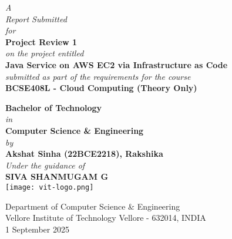 \documentclass[12pt]{article}
\begin{document}
\begin{titlepage}
\thispagestyle{empty}

\begin{minipage}[c][\textheight][s]{\textwidth}
\centering

{\itshape A}\\[6pt]
{\itshape Report Submitted}\\[6pt]
{\itshape for}\\[10pt]
{\Large\bfseries Project Review 1}\\[8pt]
{\itshape on the project entitled}\\[10pt]
{\LARGE\bfseries Java Service on AWS EC2 via Infrastructure as Code}\\[10pt]

{\itshape submitted as part of the requirements for the course}\\[6pt]
{\Large\bfseries BCSE408L - Cloud Computing (Theory Only)}\\[6pt]


{\Large\bfseries Bachelor of Technology}\\[6pt]
{\itshape in}\\[4pt]
{\Large\bfseries Computer Science \& Engineering}\\[10pt]

{\itshape by}\\[6pt]
{\large\bfseries Akshat Sinha (22BCE2218), Rakshika}\\[10pt]

{\itshape Under the guidance of}\\[6pt]
{\large\bfseries SIVA SHANMUGAM G}\\[12pt]

\texttt{[image: vit-logo.png]}


{\large Department of Computer Science \& Engineering}\\
{\large Vellore Institute of Technology Vellore - 632014, INDIA}\\[8pt]
{\large 1 September 2025}

\end{minipage}
\end{titlepage}

\clearpage
{}\setcounter{page}{1}
\end{document}
